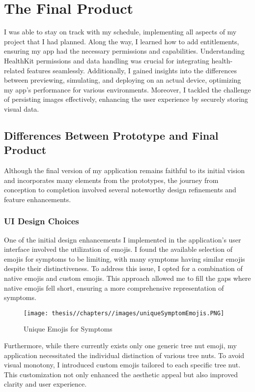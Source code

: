 \chapter{The Final Product}

I was able to stay on track with my schedule, implementing all aspects of my project that I had planned. Along the way, I learned how to add entitlements, ensuring my app had the necessary permissions and capabilities. Understanding HealthKit permissions and data handling was crucial for integrating health-related features seamlessly. Additionally, I gained insights into the differences between previewing, simulating, and deploying on an actual device, optimizing my app's performance for various environments. Moreover, I tackled the challenge of persisting images effectively, enhancing the user experience by securely storing visual data.

\section{Differences Between Prototype and Final Product}

Although the final version of my application remains faithful to its initial vision and incorporates many elements from the prototypes, the journey from conception to completion involved several noteworthy design refinements and feature enhancements.

\subsection{UI Design Choices}

One of the initial design enhancements I implemented in the application's user interface involved the utilization of emojis. I found the available selection of emojis for symptoms to be limiting, with many symptoms having similar emojis despite their distinctiveness. To address this issue, I opted for a combination of native emojis and custom emojis. This approach allowed me to fill the gaps where native emojis fell short, ensuring a more comprehensive representation of symptoms.

\begin{figure} [H]
    \centering
    \texttt{[image: thesis//chapters//images/uniqueSymptomEmojis.PNG]}
    \caption{Unique Emojis for Symptoms}
 
\end{figure}

Furthermore, while there currently exists only one generic tree nut emoji, my application necessitated the individual distinction of various tree nuts. To avoid visual monotony, I introduced custom emojis tailored to each specific tree nut. This customization not only enhanced the aesthetic appeal but also improved clarity and user experience.

